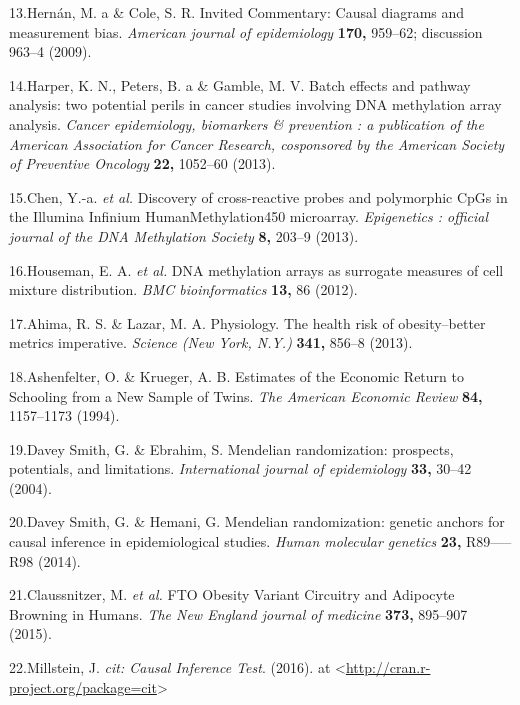 \documentclass[]{article}
\begin{document}
13.Hern{á}n, M. a \& Cole, S. R. Invited Commentary: Causal diagrams and
measurement bias. \emph{American journal of epidemiology} \textbf{170,}
959--62; discussion 963--4 (2009).

14.Harper, K. N., Peters, B. a \& Gamble, M. V. Batch effects and
pathway analysis: two potential perils in cancer studies involving DNA
methylation array analysis. \emph{Cancer epidemiology, biomarkers \&
prevention : a publication of the American Association for Cancer
Research, cosponsored by the American Society of Preventive Oncology}
\textbf{22,} 1052--60 (2013).

15.Chen, Y.-a. \emph{et al.} Discovery of cross-reactive probes and
polymorphic CpGs in the Illumina Infinium HumanMethylation450
microarray. \emph{Epigenetics : official journal of the DNA Methylation
Society} \textbf{8,} 203--9 (2013).

16.Houseman, E. A. \emph{et al.} DNA methylation arrays as surrogate
measures of cell mixture distribution. \emph{BMC bioinformatics}
\textbf{13,} 86 (2012).

17.Ahima, R. S. \& Lazar, M. A. Physiology. The health risk of
obesity--better metrics imperative. \emph{Science (New York, N.Y.)}
\textbf{341,} 856--8 (2013).

18.Ashenfelter, O. \& Krueger, A. B. Estimates of the Economic Return to
Schooling from a New Sample of Twins. \emph{The American Economic
Review} \textbf{84,} 1157--1173 (1994).

19.{Davey Smith}, G. \& Ebrahim, S. Mendelian randomization: prospects,
potentials, and limitations. \emph{International journal of
epidemiology} \textbf{33,} 30--42 (2004).

20.{Davey Smith}, G. \& Hemani, G. Mendelian randomization: genetic
anchors for causal inference in epidemiological studies. \emph{Human
molecular genetics} \textbf{23,} R89-----R98 (2014).

21.Claussnitzer, M. \emph{et al.} FTO Obesity Variant Circuitry and
Adipocyte Browning in Humans. \emph{The New England journal of medicine}
\textbf{373,} 895--907 (2015).

22.Millstein, J. \emph{cit: Causal Inference Test}. (2016). at
\textless{}\url{http://cran.r-project.org/package=cit}\textgreater{}
\end{document}
